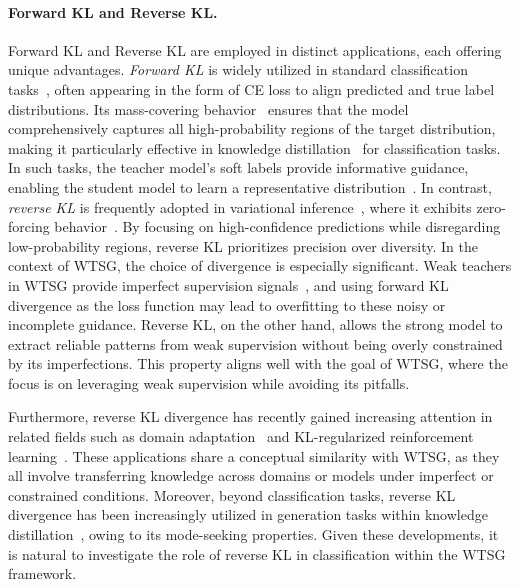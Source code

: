 \paragraph{Forward KL and Reverse KL.}
Forward KL and Reverse KL are employed in distinct applications, each offering unique advantages.
\textit{Forward KL} is widely utilized in standard classification tasks~\citep{goodfellow2016deep}, often appearing in the form of CE loss to align predicted and true label distributions.
Its mass-covering behavior~\citep{jerfel2021variational,sun2024inverse} ensures that the model comprehensively captures all high-probability regions of the target distribution, making it particularly effective in knowledge distillation~\citep{hinton2015distilling} for classification tasks.
In such tasks, the teacher model's soft labels provide informative guidance, enabling the student model to learn a representative distribution~\citep{yang-etal-2025-distilling}.
In contrast, \textit{reverse KL} is frequently adopted in variational inference~\citep{kingma2014auto,pinheiro2021variational}, where it exhibits zero-forcing behavior~\citep{minka2005divergence}.
By focusing on high-confidence predictions while disregarding low-probability regions, reverse KL prioritizes precision over diversity.
In the context of WTSG, the choice of divergence is especially significant.
Weak teachers in WTSG provide imperfect supervision signals~\citep{burns2023weak,yang2024super,yao2025understanding}, and using forward KL divergence as the loss function may lead to overfitting to these noisy or incomplete guidance.
Reverse KL, on the other hand, allows the strong model to extract reliable patterns from weak supervision without being overly constrained by its imperfections.
This property aligns well with the goal of WTSG, where the focus is on leveraging weak supervision while avoiding its pitfalls.

Furthermore, reverse KL divergence has recently gained increasing attention in related fields such as domain adaptation~\citep{nguyen2021kl} and KL-regularized reinforcement learning~\citep{rafailov2024direct,wang2023beyond,ji2024towards}.
These applications share a conceptual similarity with WTSG, as they all involve transferring knowledge across domains or models under imperfect or constrained conditions.
Moreover, beyond classification tasks, reverse KL divergence has been increasingly utilized in generation tasks within knowledge distillation~\citep{gu2024minillm,agarwal2024policy,wu2024rethinking}, owing to its mode-seeking properties.
Given these developments, it is natural to investigate the role of reverse KL in classification within the WTSG framework.






